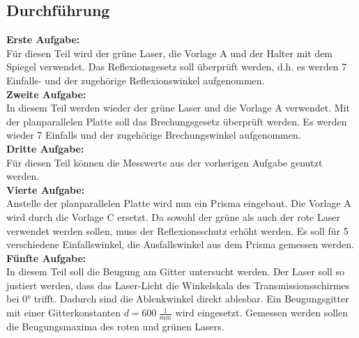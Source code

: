 \subsection{Durchführung}
\textbf{Erste Aufgabe:}\\
Für diesen Teil wird der grüne Laser, die Vorlage A und der Halter mit dem Spiegel verwendet. Das Reflexionsgesetz soll überprüft werden, d.h. es werden
7 Einfalls- und der zugehörige Reflexionswinkel aufgenommen.\\
\textbf{Zweite Aufgabe:}\\
In diesem Teil werden wieder der grüne Laser und die Vorlage A verwendet. Mit der planparallelen Platte soll das Brechungsgesetz überprüft werden.
Es werden wieder 7 Einfalls und der zugehörige Brechungswinkel aufgenommen.\\
\textbf{Dritte Aufgabe:}\\
Für diesen Teil können die Messwerte aus der vorherigen Aufgabe genutzt werden.\\
\textbf{Vierte Aufgabe:}\\
Anstelle der planparallelen Platte wird nun ein Prisma eingebaut. Die Vorlage A wird durch die Vorlage C ersetzt. Da sowohl der grüne als auch der rote Laser
verwendet werden sollen, muss der Reflexionsschutz erhöht werden. Es soll für 5 verschiedene Einfallswinkel, die Ausfallswinkel aus dem Prisma gemessen werden.\\
\textbf{Fünfte Aufgabe:}\\
In diesem Teil soll die Beugung am Gitter untersucht werden. Der Laser soll so justiert werden, dass das Laser-Licht die Winkelskala des Transmissionsschirmes
bei 0° trifft. Dadurch sind die Ablenkwinkel direkt ablesbar. Ein Beugungsgitter mit einer Gitterkonstanten $d = \SI{600}{\frac{1}{mm}}$ wird eingesetzt. 
Gemessen werden sollen die Beugungsmaxima des roten und grünen Lasers.